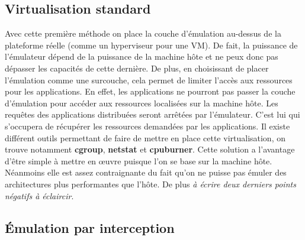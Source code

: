 \subsection{Virtualisation standard}

Avec cette première méthode on place la couche d'émulation au-dessus de la
plateforme réelle (comme un hyperviseur pour une VM). De fait, la puissance de
l'émulateur dépend de la puissance de la machine hôte et ne peux donc pas
dépasser les capacités de cette dernière. De plus, en
choisissant de placer l'émulation comme une surcouche, cela permet de limiter
l'accès aux ressources pour les applications. En effet, les applications ne
pourront pas passer la couche d'émulation pour accéder aux ressources localisées
sur la machine hôte. Les requêtes des applications distribuées seront arrêtées
par l'émulateur. C'est lui qui s'occupera de récupérer les ressources demandées
par les applications. Il existe différent outils permettant de faire de mettre
en place cette virtualisation, on trouve notamment \textbf{cgroup},
\textbf{netstat} et \textbf{cpuburner}.  Cette solution a l'avantage d'être
simple à mettre en \oe uvre puisque l'on se base sur la machine hôte. Néanmoins
elle est assez contraignante du fait qu'on ne puisse pas émuler des
architectures plus performantes que l'hôte. De plus {\color{red} \textit{à
    écrire deux derniers points négatifs à éclaircir}}.

\subsection{Émulation par interception}

